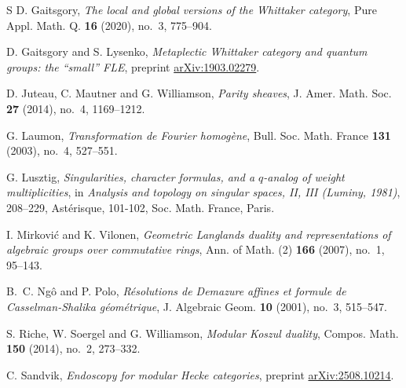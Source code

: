 \documentclass{amsart}
\theoremstyle{definition}
\begin{document}
\begin{thebibliography}{S}
        D. Gaitsgory, {\it The local and global versions of the Whittaker category}, Pure Appl. Math. Q. {\bf 16} (2020), no.~3, 775--904. 

        D. Gaitsgory and S. Lysenko, {\it Metaplectic Whittaker category and quantum groups: the ``small'' FLE}, preprint \href{https://arxiv.org/abs/1903.02279}{arXiv:1903.02279}.

        D. Juteau, C. Mautner and G. Williamson, {\it Parity sheaves}, J. Amer. Math. Soc. {\bf 27} (2014), no.~4, 1169--1212.

        G. Laumon, {\it Transformation de Fourier homog\`ene}, Bull. Soc. Math. France {\bf 131} (2003), no.~4, 527--551.

        G. Lusztig, {\it Singularities, character formulas, and a $q$-analog of weight multiplicities}, in {\it Analysis and topology on singular spaces, II, III (Luminy, 1981)}, 208--229, Ast\'erisque, 101-102, Soc. Math. France, Paris.

        I. Mirković and K. Vilonen, {\it Geometric Langlands duality and representations of algebraic groups over commutative rings}, Ann. of Math. (2) {\bf 166} (2007), no.~1, 95--143.

        B.~C. Ng\^o{} and P. Polo, {\it R\'esolutions de Demazure affines et formule de Casselman-Shalika g\'eom\'etrique}, J. Algebraic Geom. {\bf 10} (2001), no.~3, 515--547.

         S. Riche, W. Soergel and G. Williamson, {\it Modular Koszul duality}, Compos. Math. {\bf 150} (2014), no.~2, 273--332.

        C. Sandvik, {\it Endoscopy for modular Hecke categories}, preprint \href{https://arxiv.org/abs/2508.10214}{arXiv:2508.10214}.

    \end{thebibliography}
\end{document}
